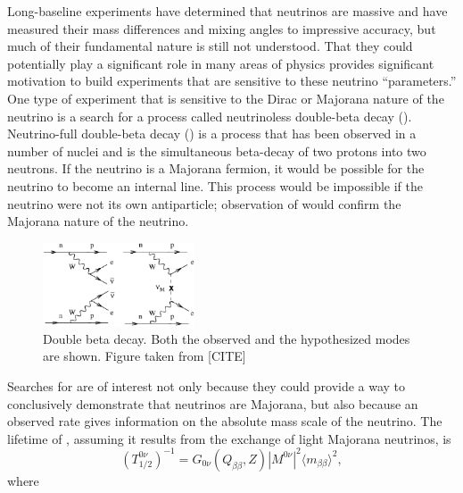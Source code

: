 Long-baseline experiments have determined that neutrinos are massive and have measured their mass differences and mixing angles to impressive accuracy, but much of their fundamental nature is still not understood.  That they could potentially play a significant role in many areas of physics provides significant motivation to build experiments that are sensitive to these neutrino ``parameters.'' One type of experiment that is sensitive to the Dirac or Majorana nature of the neutrino is a search for a process called neutrinoless double-beta decay (\zvbb).  Neutrino-full double-beta decay (\tvbb) is a process that has been observed in a number of nuclei and is the simultaneous beta-decay of two protons into two neutrons.  If the neutrino is a Majorana fermion, it would be possible for the neutrino to become an internal line.  This process would be impossible if the neutrino were not its own antiparticle; observation of \zvbb would confirm the Majorana nature of the neutrino. 
\begin{figure}[htp]
\centering
\includegraphics[width=0.4\textwidth]{figures/feynman2.eps}
\caption{Double beta decay.  Both the observed \tvbb and the hypothesized \zvbb modes are shown.  Figure taken from [CITE]}
\end{figure}
Searches for \zvbb are of interest not only because they could provide a way to conclusively demonstrate that neutrinos are Majorana, but also because an observed rate gives information on the absolute mass scale of the neutrino.  The lifetime of \zvbb, assuming it results from the exchange of light Majorana neutrinos, is 
\begin{equation}
(T^{0\nu}_{1/2})^{-1} = G_{0\nu}(Q_{\beta\beta},Z)|M^{0\nu}|^2 {\langle}m_{\beta\beta}{\rangle}^2,
\end{equation}
where

